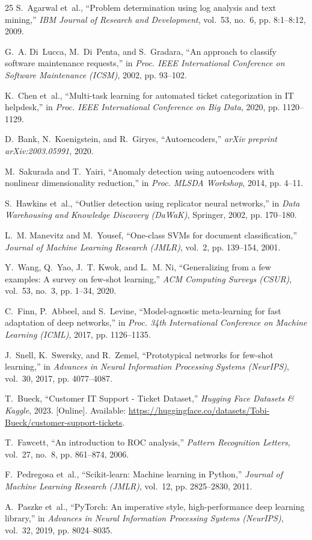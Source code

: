 \documentclass[conference]{IEEEtran}
\begin{document}
\begin{thebibliography}{25}
S.~Agarwal et~al., ``Problem determination using log analysis and text mining,'' \emph{IBM Journal of Research and Development}, vol.~53, no.~6, pp. 8:1--8:12, 2009.

G.~A. Di~Lucca, M.~Di~Penta, and S.~Gradara, ``An approach to classify software maintenance requests,'' in \emph{Proc. IEEE International Conference on Software Maintenance (ICSM)}, 2002, pp. 93--102.

K.~Chen et~al., ``Multi-task learning for automated ticket categorization in IT helpdesk,'' in \emph{Proc. IEEE International Conference on Big Data}, 2020, pp. 1120--1129.

D.~Bank, N.~Koenigstein, and R.~Giryes, ``Autoencoders,'' \emph{arXiv preprint arXiv:2003.05991}, 2020.

M.~Sakurada and T.~Yairi, ``Anomaly detection using autoencoders with nonlinear dimensionality reduction,'' in \emph{Proc. MLSDA Workshop}, 2014, pp. 4--11.

S.~Hawkins et~al., ``Outlier detection using replicator neural networks,'' in \emph{Data Warehousing and Knowledge Discovery (DaWaK)}, Springer, 2002, pp. 170--180.

L.~M. Manevitz and M.~Yousef, ``One-class SVMs for document classification,'' \emph{Journal of Machine Learning Research (JMLR)}, vol.~2, pp. 139--154, 2001.

Y.~Wang, Q.~Yao, J.~T. Kwok, and L.~M. Ni, ``Generalizing from a few examples: A survey on few-shot learning,'' \emph{ACM Computing Surveys (CSUR)}, vol.~53, no.~3, pp. 1--34, 2020.

C.~Finn, P.~Abbeel, and S.~Levine, ``Model-agnostic meta-learning for fast adaptation of deep networks,'' in \emph{Proc. 34th International Conference on Machine Learning (ICML)}, 2017, pp. 1126--1135.

J.~Snell, K.~Swersky, and R.~Zemel, ``Prototypical networks for few-shot learning,'' in \emph{Advances in Neural Information Processing Systems (NeurIPS)}, vol.~30, 2017, pp. 4077--4087.

T.~Bueck, ``Customer IT Support - Ticket Dataset,'' \emph{Hugging Face Datasets \& Kaggle}, 2023. [Online]. Available: \url{https://huggingface.co/datasets/Tobi-Bueck/customer-support-tickets}.

T.~Fawcett, ``An introduction to ROC analysis,'' \emph{Pattern Recognition Letters}, vol.~27, no.~8, pp. 861--874, 2006.

F.~Pedregosa et~al., ``Scikit-learn: Machine learning in Python,'' \emph{Journal of Machine Learning Research (JMLR)}, vol.~12, pp. 2825--2830, 2011.

A.~Paszke et~al., ``PyTorch: An imperative style, high-performance deep learning library,'' in \emph{Advances in Neural Information Processing Systems (NeurIPS)}, vol.~32, 2019, pp. 8024--8035.

\end{thebibliography}
\end{document}
